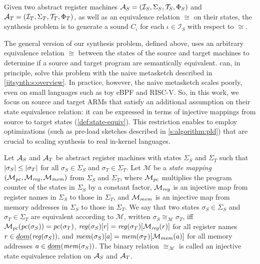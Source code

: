 \begin{definition}\label{def:synthesis-problem}  
Given two abstract register machines $\mathcal{A}_S = (\mathcal{I}_S, \Sigma_S,
\mathcal{T}_S, \Phi_S)$ and $\mathcal{A}_T=(\mathcal{I}_T, \Sigma_T,  \mathcal{T}_T, \Phi_T)$, as well
as an equivalence relation $\cong$ on their states, the \textup{\minicompiler
synthesis problem} is to generate a sound \minicompiler $C_\iota$ for each
$\iota\in\mathcal{I}_S$ with respect to $\cong$.\tighten
\end{definition} 

The general version of our synthesis problem, defined above, uses an arbitrary
equivalence relation $\cong$ between the states of the source and target
machines to determine if a source and target program are semantically
equivalent. \jitsynth can, in principle, solve this problem with the naive
metasketch described in \autoref{jitsynth:s:overview}. In practice, however, the naive
metasketch scales poorly, even on small languages such as toy eBPF and RISC-V\@.
So, in this work, we focus on source and target ARMs that satisfy an additional
assumption on their state equivalence relation: it can be expressed in terms of
injective mappings from source to target states (\autoref{def:state-equiv}).
This restriction enables \jitsynth to employ optimizations (such as pre-load
sketches described in \autoref{s:algorithm:pld}) that are crucial to scaling
synthesis to real in-kernel languages.\tighten


\begin{definition}\label{def:state-equiv}
Let $\mathcal{A}_S$ and $\mathcal{A}_T$ be abstract register machines with states $\Sigma_S$
and $\Sigma_T$ such that $|\sigma_S|\leq|\sigma_T|$ for all
$\sigma_S\in\Sigma_S$ and $\sigma_T\in\Sigma_T$. Let $\mathcal{M}$ be a
\emph{state mapping} $(\mathcal{M}_\mathit{pc}, \mathcal{M}_\mathit{reg}, \mathcal{M}_\mathit{mem})$
from $\Sigma_S$ and $\Sigma_T$,  where $\mathcal{M}_\mathit{pc}$ multiplies the program
counter of the states in $\Sigma_S$ by a constant factor, $\mathcal{M}_\mathit{reg}$ is
an injective map from register names in $\Sigma_S$ to those in $\Sigma_T$, and
$\mathcal{M}_\mathit{mem}$ is an injective map from memory addresses in $\Sigma_S$ to
those in $\Sigma_T$. We say that two states  $\sigma_S\in\Sigma_S$ and
$\sigma_T\in\Sigma_T$ are equivalent according to $\mathcal{M}$, written
$\sigma_S \cong_\mathcal{M} \sigma_T$, iff $\mathcal{M}_\mathit{pc}(\mathit{pc}(\sigma_S)) =
\mathit{pc}(\sigma_T)$, $\mathit{reg}(\sigma_S)[r] = \mathit{reg}(\sigma_T)[\mathcal{M_\mathit{reg}}(r)]$ for
all register names $r\in\emph{dom}(\mathit{reg}(\sigma_S))$, and $\mathit{mem}(\sigma_S)[a] =
\mathit{mem}(\sigma_T)[\mathcal{M_\mathit{mem}}(a)]$ for all memory addresses
$a\in\emph{dom}(\mathit{mem}(\sigma_S))$. The binary relation $\cong_\mathcal{M}$ is
called an \textup{injective state equivalence relation} on $\mathcal{A}_S$ and
$\mathcal{A}_T$.
\end{definition}

